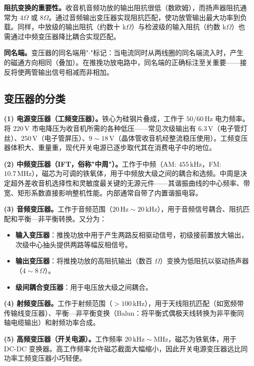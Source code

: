 \documentclass[12pt,UTF8]{ctexbook}
\begin{document}
\textbf{阻抗变换的重要性。}收音机音频功放的输出阻抗很低（数欧姆），而扬声器阻抗通常为 $4\Omega$ 或 $8\Omega$。通过音频输出变压器实现阻抗匹配，使功放管输出最大功率到负载。同样，中放级的输出阻抗（约数十 k$\Omega$）与检波级的输入阻抗（约数 k$\Omega$）也需通过中频变压器降比耦合实现匹配。

\textbf{同名端。}变压器的同名端用"$\cdot$"标记：当电流同时从两线圈的同名端流入时，产生的磁通方向相同（叠加）。在推挽功放电路中，同名端的正确标注至关重要——接反将使两管输出信号相减而非相加。

\subsection{变压器的分类}

\textbf{(1) 电源变压器（工频变压器）。}铁心为硅钢片叠成，工作于 $50/60\,\mathrm{Hz}$ 电力频率。将 $220\,\mathrm{V}$ 市电降压为收音机所需的各种低压——常见次级输出有 $6.3\,\mathrm{V}$（电子管灯丝）、$250\,\mathrm{V}$（电子管屏压）、$9\sim18\,\mathrm{V}$（晶体管收音机经整流稳压使用）。工频变压器体积大、重量重，现代开关电源已逐步取代其在消费电子中的地位。

\textbf{(2) 中频变压器（IFT，俗称"中周"）。}工作于中频（AM: $455\,\mathrm{kHz}$，FM: $10.7\,\mathrm{MHz}$），磁芯为可调的铁氧体，用于中频放大级之间的耦合和选频。中周是决定超外差收音机选择性和灵敏度最关键的无源元件——其谐振曲线的中心频率、带宽、矩形系数直接影响整机性能。内部通常自带了内置谐振电容。

\textbf{(3) 音频变压器。}工作于音频范围（$20\,\mathrm{Hz}\sim20\,\mathrm{kHz}$），用于音频信号耦合、阻抗匹配和平衡—非平衡转换。又分为：
\begin{itemize}
  \item \textbf{输入变压器}：推挽功放中用于产生两路反相驱动信号，初级接前置放大输出，次级中心抽头提供两路等幅反相信号。
  \item \textbf{输出变压器}：将推挽功放的高阻抗输出（数百 $\Omega$）变换为低阻抗以驱动扬声器（$4\sim8\,\Omega$）。
  \item \textbf{级间耦合变压器}：用于电压放大级之间耦合。
\end{itemize}

\textbf{(4) 射频变压器。}工作于射频范围（$>100\,\mathrm{kHz}$），用于天线阻抗匹配（如宽频带传输线变压器）、平衡—非平衡变换（Balun：将平衡式偶极天线转换为非平衡同轴电缆输出）和射频功率合成。

\textbf{(5) 高频变压器（开关电源）。}工作频率 $20\,\mathrm{kHz}\sim \mathrm{MHz}$，磁芯为铁氧体，用于 DC-DC 变换器。高工作频率允许磁芯截面大幅缩小，因此开关电源变压器远比同功率工频变压器小巧轻便。
\end{document}
